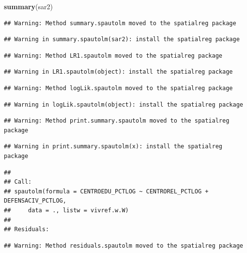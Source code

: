 \documentclass[11pt,]{article}
\newenvironment{Shaded}{\begin{snugshade}}{\end{snugshade}}
\newcommand{\KeywordTok}[1]{\textcolor[rgb]{0.13,0.29,0.53}{\textbf{#1}}}
\newcommand{\NormalTok}[1]{#1}
\begin{document}
\begin{Shaded}
\begin{Highlighting}[]
\KeywordTok{summary}\NormalTok{(sar2)}
\end{Highlighting}
\end{Shaded}

\begin{verbatim}
## Warning: Method summary.spautolm moved to the spatialreg package
\end{verbatim}

\begin{verbatim}
## Warning in summary.spautolm(sar2): install the spatialreg package
\end{verbatim}

\begin{verbatim}
## Warning: Method LR1.spautolm moved to the spatialreg package
\end{verbatim}

\begin{verbatim}
## Warning in LR1.spautolm(object): install the spatialreg package
\end{verbatim}

\begin{verbatim}
## Warning: Method logLik.spautolm moved to the spatialreg package
\end{verbatim}

\begin{verbatim}
## Warning in logLik.spautolm(object): install the spatialreg package
\end{verbatim}

\begin{verbatim}
## Warning: Method print.summary.spautolm moved to the spatialreg package
\end{verbatim}

\begin{verbatim}
## Warning in print.summary.spautolm(x): install the spatialreg package
\end{verbatim}

\begin{verbatim}
## 
## Call: 
## spautolm(formula = CENTROEDU_PCTLOG ~ CENTROREL_PCTLOG + DEFENSACIV_PCTLOG, 
##     data = ., listw = vivref.w.W)
## 
## Residuals:
\end{verbatim}

\begin{verbatim}
## Warning: Method residuals.spautolm moved to the spatialreg package
\end{verbatim}
\end{document}
